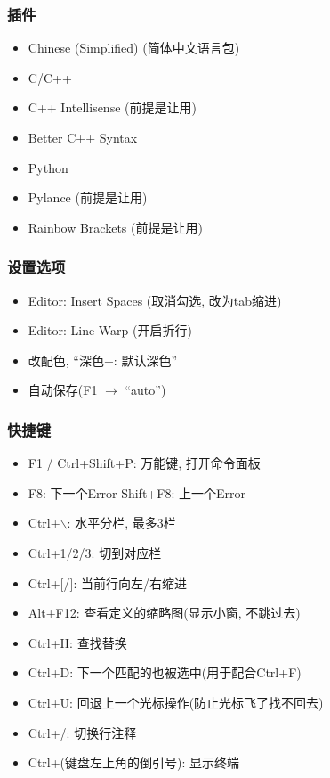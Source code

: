 \subsubsection{插件}

\begin{itemize}
	\item Chinese (Simplified) (简体中文语言包)
	\item C/C++
	\item C++ Intellisense (前提是让用)
	\item Better C++ Syntax
	\item Python
	\item Pylance (前提是让用)
	\item Rainbow Brackets (前提是让用)
\end{itemize}

\subsubsection{设置选项}

\begin{itemize}
	\item Editor: Insert Spaces (取消勾选, 改为tab缩进)
	\item Editor: Line Warp (开启折行)
	\item 改配色, ``深色+: 默认深色''
	\item 自动保存(F1 $\rightarrow$ ``auto'')
\end{itemize}

\subsubsection{快捷键}

\begin{itemize}
	\item F1 / Ctrl+Shift+P: 万能键, 打开命令面板
	\item F8: 下一个Error  Shift+F8: 上一个Error
	\item Ctrl+$\backslash$: 水平分栏, 最多3栏
	\item Ctrl+1/2/3: 切到对应栏
	\item Ctrl+[/]: 当前行向左/右缩进
	\item Alt+F12: 查看定义的缩略图(显示小窗, 不跳过去)
	\item Ctrl+H: 查找替换
	\item Ctrl+D: 下一个匹配的也被选中(用于配合Ctrl+F)
	\item Ctrl+U: 回退上一个光标操作(防止光标飞了找不回去)
	\item Ctrl+/: 切换行注释
	\item Ctrl+(键盘左上角的倒引号): 显示终端
\end{itemize}